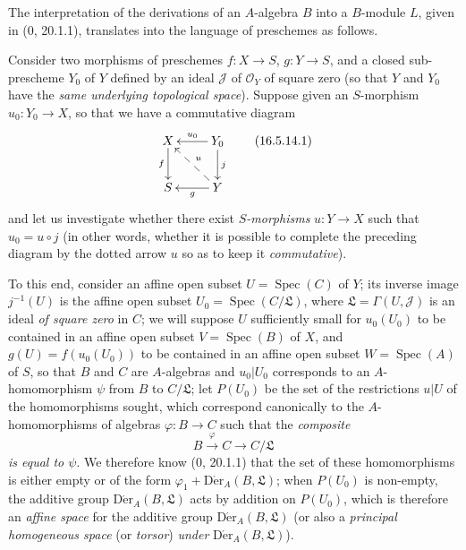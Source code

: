 \begin{env}[16.5.14]
\label{IV.16.5.14}
The interpretation of the derivations of an $A$-algebra $B$ into a $B$-module
$L$, given in (0, 20.1.1), translates into the language of preschemes as
follows.

Consider two morphisms of preschemes $f:X\to S$, $g:Y\to S$, and a
closed sub-prescheme $Y_0$ of $Y$ defined by an ideal $\mathscr{J}$ of
$\mathcal{O}_Y$ of square zero (so that $Y$ and $Y_0$ have the
\emph{same underlying topological space}). Suppose given an $S$-morphism
$u_0:Y_0\to X$, so that we have a commutative diagram
\[
  \xymatrix{
    X\ar[d]_-f & Y_0\ar[l]_-{u_0}\ar[d]^j\\
    S & Y\ar@{-->}[ul]_-u\ar[l]^-g
  }
  \tag{16.5.14.1}
  \label{IV.16.5.14.1}
\]
and let us investigate whether there exist \emph{$S$-morphisms}
$u:Y\to X$ such that $u_0=u\circ j$ (in other words, whether it is possible to
complete the preceding diagram by the dotted arrow $u$ so as to
keep it \emph{commutative}).

To this end, consider an affine open subset $U=\operatorname{Spec}(C)$ of $Y$;
its inverse image $j^{-1}(U)$ is the affine open subset
$U_0=\operatorname{Spec}(C/\mathfrak{L})$, where
$\mathfrak{L}=\Gamma(U,\mathscr{J})$ is an ideal \emph{of square zero} in $C$;
we will suppose $U$ sufficiently small for $u_0(U_0)$ to be contained in an
affine open subset $V=\operatorname{Spec}(B)$ of $X$, and
$g(U)=f(u_0(U_0))$ to be contained in an affine open subset
$W=\operatorname{Spec}(A)$ of $S$, so that $B$ and $C$ are
$A$-algebras and $u_0|U_0$ corresponds to an $A$-homomorphism $\psi$ from
$B$ to $C/\mathfrak{L}$; let $P(U_0)$ be the set of the restrictions $u|U$
of the homomorphisms sought, which correspond canonically to the
$A$-homomorphisms of algebras $\varphi:B\to C$ such that the \emph{composite}
\[
  B\xrightarrow{\varphi}C\longrightarrow C/\mathfrak{L}
\]
\emph{is equal to $\psi$}. We therefore know (0, 20.1.1) that the set of these
homomorphisms is either empty or of the form
$\varphi_1+\operatorname{D\acute{e}r}_A(B,\mathfrak{L})$; when $P(U_0)$ is
non-empty, the additive group $\operatorname{D\acute{e}r}_A(B,\mathfrak{L})$ acts by
addition on $P(U_0)$, which is therefore an \emph{affine space} for the
additive group $\operatorname{D\acute{e}r}_A(B,\mathfrak{L})$ (or also a
\emph{principal homogeneous space} (or \emph{torsor}) \emph{under}
$\operatorname{D\acute{e}r}_A(B,\mathfrak{L})$).


\end{env}
